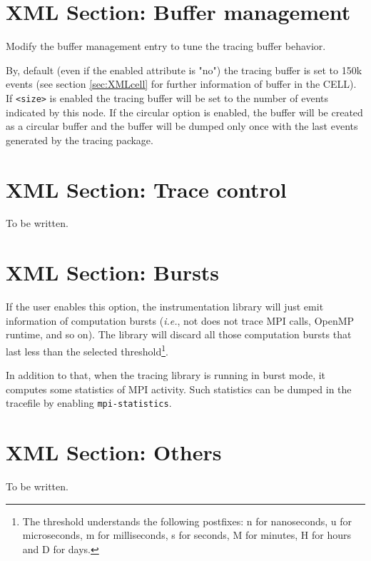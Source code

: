 \section{XML Section: Buffer management}\label{sec:XMLSectionBuffer}

Modify the buffer management entry to tune the tracing buffer behavior.



By, default (even if the enabled attribute is "no") the tracing buffer is set to 150k events (see section \ref{sec:XMLcell} for further information of buffer in the CELL). If {\tt <size>} is enabled the tracing buffer will be set to the number of events indicated by this node. If the circular option is enabled, the buffer will be created as a circular buffer and the buffer will be dumped only once with the last events generated by the tracing package.

\section{XML Section: Trace control}\label{sec:XMLSectionTraceControl}

To be written.

\section{XML Section: Bursts}\label{sec:XMLSectionBursts}



If the user enables this option, the instrumentation library will just emit information of computation bursts ({\em i.e.}, not does not trace {MPI} calls, {OpenMP} runtime, and so on). The library will discard all those computation bursts that last less than the selected threshold\footnote{The threshold understands the following postfixes: n for nanoseconds, u for microseconds, m for milliseconds, s for seconds, M for minutes, H for hours and D for days.}. 

In addition to that, when the tracing library is running in burst mode, it computes some statistics of MPI activity. Such statistics can be dumped in the tracefile by enabling {\tt mpi-statistics}.

\section{XML Section: Others}\label{sec:XMLSectionOthers}

To be written.
